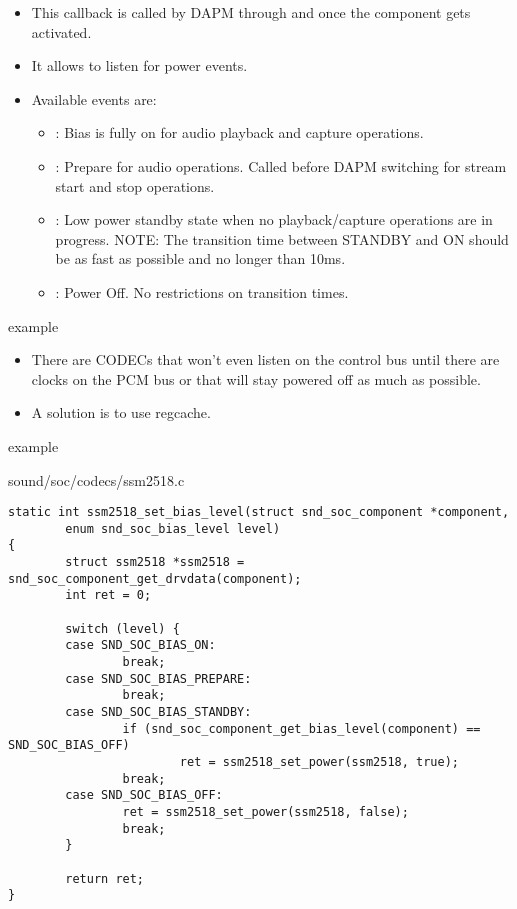 \begin{frame}{}
  \begin{itemize}
  \item This callback is called by DAPM through
     and
     once the component gets
    activated.
  \item It allows to listen for power events.
  \item Available events are:
    \begin{itemize}
    \item {}: Bias is fully on for audio playback
      and capture operations.
    \item {}: Prepare for audio operations.
      Called before DAPM switching for
      stream start and stop operations.
    \item {}: Low power standby state when no
      playback/capture operations are
      in progress. NOTE: The transition time between STANDBY and ON
      should be as fast as possible and no longer than 10ms.
    \item {}: Power Off. No restrictions on
      transition times.
    \end{itemize}
  \end{itemize}
\end{frame}

\begin{frame}{ example}
  \begin{itemize}
  \item There are CODECs that won't even listen on the control
    bus until there are clocks on the PCM bus or that will stay
    powered off as much as possible.
  \item A solution is to use regcache.
  \end{itemize}
\end{frame}

\begin{frame}[fragile]{ example}
  \begin{block}{sound/soc/codecs/ssm2518.c}
    \fontsize{8}{8}\selectfont
    \begin{verbatim}
static int ssm2518_set_bias_level(struct snd_soc_component *component,
        enum snd_soc_bias_level level)
{
        struct ssm2518 *ssm2518 = snd_soc_component_get_drvdata(component);
        int ret = 0;

        switch (level) {
        case SND_SOC_BIAS_ON:
                break;
        case SND_SOC_BIAS_PREPARE:
                break;
        case SND_SOC_BIAS_STANDBY:
                if (snd_soc_component_get_bias_level(component) == SND_SOC_BIAS_OFF)
                        ret = ssm2518_set_power(ssm2518, true);
                break;
        case SND_SOC_BIAS_OFF:
                ret = ssm2518_set_power(ssm2518, false);
                break;
        }

        return ret;
}
    \end{verbatim}
  \end{block}
\end{frame}

